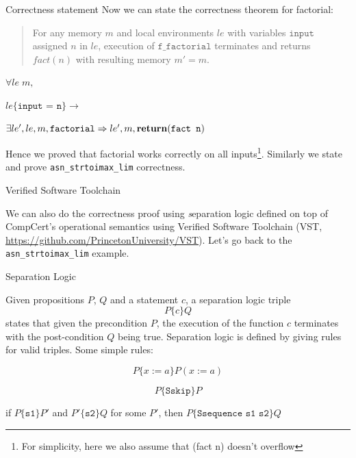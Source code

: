 \documentclass[10pt,usenames,dvipsnames,landscape]{beamer}
\begin{document}
 \begin{frame}{Correctness statement}
    Now we can state the correctness theorem for factorial:
    
    
   \begin{quote}
     For any memory $m$ and local environments $le$ with variables $\texttt{input}$ assigned $n$ in $le$, execution of $\texttt{f\_factorial}$ terminates and returns $fact(n)$ with resulting memory $m' = m$.
   \end{quote}
   
   \begin{theorem} $\forall le \; m,$ 
    
    $le\{\texttt{input = n}\} \rightarrow $
    
    $\exists le', le, m, \texttt{factorial} \Rightarrow  le', m,  {\bf return}(\texttt{fact n}) $
    
    \end{theorem}

   Hence we proved that factorial works correctly on all inputs\footnote{For simplicity, here we also assume that (fact n) doesn't overflow}. Similarly we state and prove \texttt{asn\_strtoimax\_lim} correctness. 
      
      \end{frame}
    

\begin{frame}{Verified Software Toolchain}
    
    We can also do the correctness proof using {\emph separation logic} defined on top of CompCert's operational semantics using Verified Software Toolchain (VST, \url{https://github.com/PrincetonUniversity/VST}). Let's go back to the \texttt{asn\_strtoimax\_lim} example.
    
    
\end{frame}

\begin{frame}{Separation Logic}

Given propositions $P$, $Q$ and a statement $c$, a separation logic triple $$P \{c\} Q$$ states that given the precondition $P$, the execution of the function $c$ terminates with the post-condition $Q$ being true. Separation logic is defined by giving rules for valid triples. Some simple rules:

$$P \{x := a\} P(x := a)$$ 

$$P \{\texttt{Sskip}\} P$$

if $P \{\texttt{s1\}} P'$ and $P' \{\texttt{s2}\} Q$ for some $P'$, then $ P \{ \texttt{Ssequence s1 s2} \} Q$
    
\end{frame}
\end{document}
